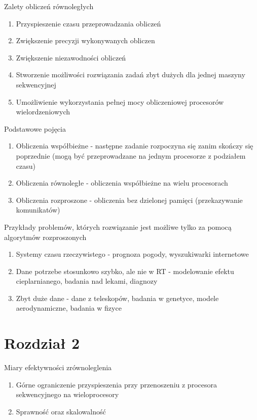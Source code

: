\documentclass{beamer}
\begin{document}
\begin{frame}{Zalety obliczeń równoległych}
  \begin{enumerate}
  \item Przyspieszenie czasu przeprowadzania obliczeń
  \item Zwiększenie precyzji wykonywanych obliczen
  \item Zwiększenie niezawodności obliczeń
  \item Stworzenie możliwości rozwiązania zadań zbyt dużych dla jednej maszyny sekwencyjnej
  \item Umożliwienie wykorzystania pełnej mocy obliczeniowej procesorów wielordzeniowych
  \end{enumerate}
\end{frame}

\begin{frame}{Podstawowe pojęcia}
  \begin{enumerate}
  \item Obliczenia współbieżne - następne zadanie rozpoczyna się zanim skończy się poprzednie (mogą być przeprowadzane na jednym procesorze z podziałem czasu)
  \item Obliczenia równoległe - obliczenia współbieżne na wielu procesorach
  \item Obliczenia rozproszone - obliczenia bez dzielonej pamięci (przekazywanie komunikatów)
  \end{enumerate}
\end{frame}

\begin{frame}{Przykłady problemów, których rozwiązanie jest możliwe tylko za pomocą algorytmów rozproszonych}
  \begin{enumerate}
  \item Systemy czasu rzeczywistego - prognoza pogody, wyszukiwarki internetowe
  \item Dane potrzebe stosunkowo szybko, ale nie w RT - modelowanie efektu cieplarnianego, badania nad lekami, diagnozy
  \item Zbyt duże dane - dane z teleskopów, badania w genetyce, modele aerodynamiczne, badania w fizyce
  \end{enumerate}
\end{frame}

\section{Rozdział 2}

\begin{frame}{Miary efektywności zrównoleglenia}
  \begin{enumerate}
  \item Górne ograniczenie przyspieszenia przy przenoszeniu z procesora sekwencyjnego na wieloprocesory
  \item Sprawność oraz skalowalność
  \end{enumerate}
\end{frame}
\end{document}
